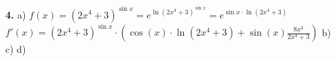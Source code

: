 \documentclass[a4paper,11pt]{article}
\begin{document}
\begin{enumerate}
        \item[\textbf{4.}]
            \subitem a)
                \( f(x)=(2x^4+3)^{\sin x} = e^{\ln (2x^4+3)^{\sin x}} = e^{\sin x \cdot \ln (2x^4+3)}\)\\
                \( f'(x)= (2x^4+3)^{\sin x} \cdot \left( \cos(x) \cdot \ln(2x^4+3) + \sin(x) \frac{8x^3}{2x^4+3} \right) \)
            \subitem b)
            \subitem c)
            \subitem d)

    \end{enumerate}
\end{document}

